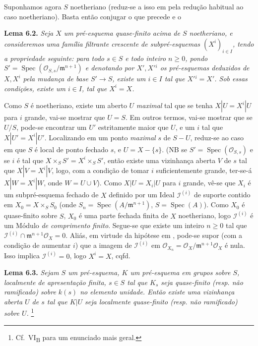Suponhamos agora \(S\) noetheriano (reduz-se a isso em
 pela redução habitual ao
caso noetheriano). Basta então conjugar o que precede e o

\medskip
\noindent{}\textbf{Lema 6.2.}
\textit{Seja \(X\) um pré-esquema quase-finito acima de \(S\)
noetheriano, e consideremos uma família filtrante crescente
de subpré-esquemas \((X^i)_{i\in I}\), tendo a propriedade
seguinte: para todo \(s\in S\) e todo inteiro \(n\geq0\),
pondo \(S'=\operatorname{Spec}
(\mathscr O_{S,s}/\mathfrak m^{n+1})\) e denotando por
\(X',X'{}^i\) os pré-esquemas deduzidos de \(X,X^i\) pela
mudança de base \(S'\to S\), existe um \(i\in I\) tal que
\(X'{}^i=X'\). Sob essas condições, existe um \(i\in I\),
tal que \(X^i=X\).}

Como \(S\) é noetheriano, existe um aberto \(U\)
\emph{maximal} tal que se tenha \(X|U=X^i|U\) para \(i\)
grande, vai-se mostrar que \(U=S\). Em outros termos,
vai-se mostrar que se \(U/S\), pode-se encontrar um \(U'\)
estritamente maior que \(U\), e um \(i\) tal que
\(X|U'=X^i|U'\). Localizando em um ponto \emph{maximal}
\(s\) de \(S-U\), reduz-se ao caso em que \(S\) é local
de ponto fechado \(s\), e \(U=X-\{s\}\). (NB se
\(S'=\operatorname{Spec}(\mathscr O_{S,s})\) e se \(i\)
é tal que \(X\times_SS'=X^i\times_SS'\), então existe
uma vizinhança aberta \(V\) de \(s\) tal que \(X|V=X^i|V\),
logo, com a condição de tomar \(i\) suficientemente grande,
ter-se-á \(X|W=X^i|W\), onde \(W=U\cup V\)). Como
\(X|U=X_i|U\) para \(i\) grande, vê-se que \(X_i\) é um
subpré-esquema fechado de \(X\) definido por um Ideal
\(\mathscr I^{(i)}\) de suporte contido em
\(X_0=X\times_SS_0\) (onde
\(S_n=\operatorname{Spec}(A/\mathfrak m^{n+1})\),
\(S=\operatorname{Spec}(A)\)). Como \(X_0\) é quase-finito
sobre \(S\), \(X_0\) é uma parte fechada finita de \(X\)
noetheriano, logo \(\mathscr I^{(i)}\) é um Módulo
\emph{de comprimento finito}. Segue-se que existe um inteiro
\(n\geq0\) tal que
\(\mathscr I^{(i)}\cap\mathfrak m^{n+1}\mathscr O_X=0\).
Aliás, em virtude da hipótese em
, pode-se supor (com a
condição de aumentar \(i\)) que a imagem de
\(\mathscr I^{(i)}\) em
\(\mathscr O_{X_n}=\mathscr O_X/\mathfrak m^{n+1}\mathscr O_X\)
é nula. Isso implica \(\mathscr I^{(i)}=0\), logo \(X^i=X\),
cqfd.

\medskip
\noindent{}\textbf{Lema 6.3.}
\textit{Sejam \(S\) um pré-esquema, \(K\) um pré-esquema em
grupos sobre \(S\), localmente de apresentação finita,
\(s\in S\) tal que \(K_s\) seja quase-finito (resp. não
ramificado) sobre \(k(s)\) no elemento unidade. Então existe
uma vizinhança aberta \(U\) de \(s\) tal que \(K|U\) seja
localmente quase-finito (resp. não ramificado) sobre \(U\).}%
\begingroup
\renewcommand{\thefootnote}{\(\ast\)}%
\footnote{Cf.\ VI\textsubscript{B}
 para um enunciado mais geral.}%
\addtocounter{footnote}{-1}%
\endgroup

